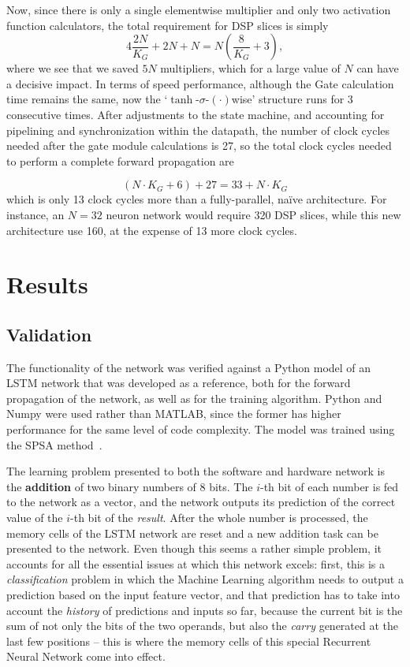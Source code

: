 \documentclass{IEEEtran}
\begin{document}
Now, since there is only a single elementwise multiplier and only two activation function calculators, the total requirement for DSP slices is simply
\begin{equation}\label{eq:numdsp_network-opt}
    4\frac{2N}{K_G} + 2N + N = N \left( \frac{8}{K_G} + 3 \right),
\end{equation}
where we see that we saved $5N$ multipliers, which for a large value of $N$ can have a decisive impact. In terms of speed performance, although the Gate
calculation time remains the same, now the `$\tanh$-$\sigma$-$(\cdot)$wise' structure runs for 3 consecutive times. After adjustments to the state machine, and accounting for
pipelining and synchronization within the datapath, the number of clock cycles needed after the gate module calculations is 27, so the total clock cycles needed to perform a
complete forward propagation are

\begin{equation}\label{eq:numcc_network-opt}
    (N \cdot K_G + 6) + 27  = 33 + N\cdot K_G
\end{equation}
which is only 13 clock cycles more than a fully-parallel, naïve architecture. For instance, an $N=32$ neuron network would
require 320 DSP slices, while this new architecture use 160, at the expense of 13 more clock cycles.

\section{Results}\label{sec:results}

\subsection{Validation}\label{sec:res-val}

The functionality of the network was verified against a Python model of an LSTM network that was developed as a reference,
both for the forward propagation of the network, as well as for the training algorithm. Python and Numpy were used rather than MATLAB,
since the former has higher performance for the same level of code complexity. The model was trained using the SPSA method~\cite{Spall98}.

The learning problem presented to both the software and hardware network is the \textbf{addition} of two binary numbers of 8 bits. The $i$-th
bit of each number is fed to the network as a vector, and the network outputs its prediction of the correct value of the $i$-th bit
of the \emph{result}. After the whole number is processed, the memory cells of the LSTM network are reset and a new addition
task can be presented to the network. Even though this seems a rather simple problem, it accounts for all the essential issues at which this
network excels: first, this is a \emph{classification} problem in which the Machine Learning algorithm needs to output a prediction based on
the input feature vector, and that prediction has to take into account the \emph{history} of predictions and inputs so far, because the current
bit is the sum of not only the bits of the two operands, but also the \emph{carry} generated at the last few positions -- this is where the
memory cells of this special Recurrent Neural Network come into effect.
\end{document}
